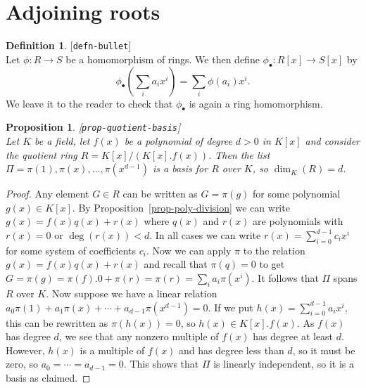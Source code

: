 \documentclass{amsart}
\newcommand{\lbl}[1]{\label{#1}\textup{[\texttt{#1}]}\ \\}
\newcommand{\lbl}{\label}
\renewcommand{\:}{\colon}
\newtheorem{proposition}[theorem]{Proposition}
\theoremstyle{definition}
\newtheorem{definition}[theorem]{Definition}
\begin{document}
\section{Adjoining roots}
\label{sec-adjoining}

\begin{definition}\lbl{defn-bullet}
 Let $\phi\:R\to S$ be a homomorphism of rings.  We then define
 $\phi_\bullet\:R[x]\to S[x]$ by 
 \[ \phi_\bullet(\sum_ia_ix^i) = \sum_i\phi(a_i)x^i. \]
 We leave it to the reader to check that $\phi_\bullet$ is again a
 ring homomorphism.
\end{definition}

\begin{proposition}\lbl{prop-quotient-basis}
 Let $K$ be a field, let $f(x)$ be a polynomial of degree $d>0$ in
 $K[x]$ and consider the quotient ring $R=K[x]/(K[x].f(x))$.  Then the
 list $\Pi=\pi(1),\pi(x),\dotsc,\pi(x^{d-1})$ is a basis for $R$ over
 $K$, so $\dim_K(R)=d$.
\end{proposition}
\begin{proof}
 Any element $G\in R$ can be written as $G=\pi(g)$ for some polynomial
 $g(x)\in K[x]$.  By Proposition~\ref{prop-poly-division} we can write
 $g(x)=f(x)q(x)+r(x)$ where $q(x)$ and $r(x)$ are polynomials with
 $r(x)=0$ or $\deg(r(x))<d$.  In all cases we can write
 $r(x)=\sum_{i=0}^{d-1}c_ix^i$ for some system of coefficients $c_i$.
 Now we can apply $\pi$ to the relation $g(x)=f(x)q(x)+r(x)$ and
 recall that $\pi(q)=0$ to get
 $G=\pi(g)=\pi(f).0+\pi(r)=\pi(r)=\sum_ia_i\pi(x^i)$.  It follows that
 $\Pi$ spans $R$ over $K$.  Now suppose we have a linear relation
 $a_0\pi(1)+a_1\pi(x)+\dotsb+a_{d-1}\pi(x^{d-1})=0$.  If we put
 $h(x)=\sum_{i=0}^{d-1}a_ix^i$, this can be rewritten as
 $\pi(h(x))=0$, so $h(x)\in K[x].f(x)$.  As $f(x)$ has degree $d$, we
 see that any nonzero multiple of $f(x)$ has degree at least $d$.
 However, $h(x)$ is a multiple of $f(x)$ and has degree less than $d$,
 so it must be zero, so $a_0=\dotsb=a_{d-1}=0$.  This shows that $\Pi$
 is linearly independent, so it is a basis as claimed. 
\end{proof}
\end{document}
